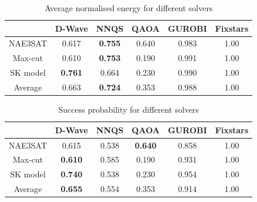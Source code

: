 \begin{table}[!htb]
    \centering
    \caption{Average normalised energy for different solvers}
    \label{results:allnormalizedenergy}
    \begin{tabular}{cccccc} \toprule
        ~ & D-Wave & NNQS & QAOA & GUROBI & Fixstars \\ \midrule
        NAE3SAT & 0.617 & \textbf{0.755} & 0.640 & 0.983 & 1.00 \\
        Max-cut & 0.610 & \textbf{0.753} & 0.190 & 0.991 & 1.00 \\
        SK model & \textbf{0.761} & 0.664 & 0.230 & 0.990 & 1.00 \\ \midrule
        Average & 0.663 & \textbf{0.724} & 0.353 & 0.988 & 1.00 \\ \bottomrule
    \end{tabular}
\end{table}

\begin{table}[!htb]
    \centering
    \caption{Success probability for different solvers}
    \label{results:allsuccess}
    \begin{tabular}{cccccc} \toprule
        ~ & D-Wave & NNQS & QAOA & GUROBI & Fixstars \\ \midrule
        NAE3SAT & 0.615 & 0.538 & \textbf{0.640} & 0.858 & 1.00 \\
        Max-cut & \textbf{0.610} & 0.585 & 0.190 & 0.931 & 1.00 \\
        SK model & \textbf{0.740} & 0.538 & 0.230 & 0.954 & 1.00 \\ \midrule
        Average & \textbf{0.655} & 0.554 & 0.353 & 0.914 & 1.00 \\ \bottomrule
    \end{tabular}
\end{table}

